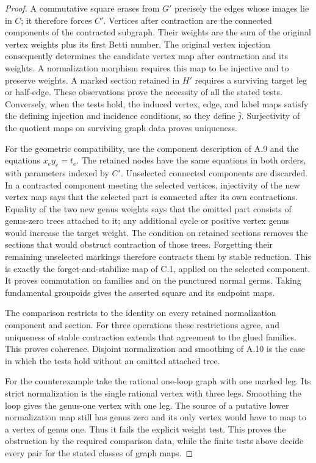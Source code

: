 \begin{proof}
A commutative square erases from $G'$ precisely the edges whose
images lie in $C$; it therefore forces $C'$. Vertices after contraction
are the connected components of the contracted subgraph. Their
weights are the sum of the original vertex weights plus its first
Betti number. The original vertex injection consequently determines
the candidate vertex map after contraction and its weights. A
normalization morphism requires this map to be injective and to
preserve weights. A marked section retained in $H'$ requires a
surviving target leg or half-edge. These observations prove the
necessity of all the stated tests. Conversely, when the tests hold,
the induced vertex, edge, and label maps satisfy the defining
injection and incidence conditions, so they define $\bar j$.
Surjectivity of the quotient maps on surviving graph data proves
uniqueness.

For the geometric compatibility, use the component description of
A.9 and the equations $x_ey_e=t_e$. The retained nodes have the
same equations in both orders, with parameters indexed by $C'$.
Unselected connected components are discarded. In a contracted
component meeting the selected vertices, injectivity of the new
vertex map says that the selected part is connected after its
own contractions. Equality of the two new genus weights says that
the omitted part consists of genus-zero trees attached to it;
any additional cycle or positive vertex genus would increase the
target weight. The condition on retained sections removes the
sections that would obstruct contraction of those trees. Forgetting
their remaining unselected markings therefore contracts them by
stable reduction. This is exactly the forget-and-stabilize map of
C.1, applied on the selected component. It proves commutation on
families and on the punctured normal germs. Taking fundamental
groupoids gives the asserted square and its endpoint maps.

The comparison restricts to the identity on every retained
normalization component and section. For three operations these
restrictions agree, and uniqueness of stable contraction extends
that agreement to the glued families. This proves coherence.
Disjoint normalization and smoothing of A.10 is the case in which
the tests hold without an omitted attached tree.

For the counterexample take the rational one-loop graph with one
marked leg. Its strict normalization is the single rational vertex
with three legs. Smoothing the loop gives the genus-one vertex with
one leg. The source of a putative lower normalization map still
has genus zero and its only vertex would have to map to a vertex
of genus one. Thus it fails the explicit weight test. This proves
the obstruction by the required comparison data, while the finite
tests above decide every pair for the stated classes of graph maps.
\end{proof}
